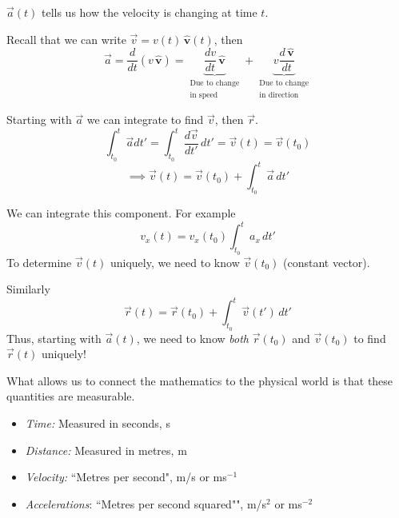 \documentclass[twoside]{scrartcl}
\newcommand{\vsp}{\vspace*{5pt}}
\let\oldhat\hat
\renewcommand{\hat}[1]{\,\oldhat{\boldsymbol{\mathbf{#1}}}}
\begin{document}
$\vec{a}(t)$ tells us how the velocity is changing at time $t$. 

Recall that we can write $\vec{v} = v(t)\hat{v}(t)$, then
\[\vec{a} = \frac{d}{dt}(v\hat{v}) = \underbrace{\frac{dv}{dt}\hat{v}}_{\substack{\text{Due to change}\\ \text{in speed}}} + \underbrace{v\frac{d\hat{v}}{dt}}_{\substack{\text{Due to change}\\ \text{in direction}}}\]



Starting with $\vec{a}$ we can integrate to find $\vec{v}$, then $\vec{r}$. 
\[\int_{t_0}^{t} \vec{a}dt' = \int_{t_0}^{t} \frac{d\vec{v}}{dt'}\,dt' = \vec{v}(t) = \vec{v}(t_0)
\]
\[\implies \vec{v}(t) = \vec{v}(t_0) + \int_{t_0}^t \vec{a}\,dt'\]

We can integrate this component. For example 
\[v_x(t) = v_x(t_0) \int_{t_0}^t a_x\,dt'\]
To determine $\vec{v}(t)$ uniquely, we need to know $\vec{v}(t_0)$ (constant vector). 

Similarly
\[\vec{r}(t) = \vec{r}(t_0) + \int_{t_0}^t \vec{v}(t')\,dt'\]
Thus, starting with $\vec{a}(t)$, we need to know \emph{both} $\vec{r}(t_0)$ and $\vec{v}(t_0)$ to find $\vec{r}(t)$ uniquely! 

What allows us to connect the mathematics to the physical world is that these quantities are measurable. \\

\begin{definition}[SI Units]\begin{itemize}
\item \emph{Time:} Measured in seconds, s

\item \emph{Distance:} Measured in metres, m

\item \emph{Velocity:} ``Metres per second", m/s or ms$^{-1}$
	
\item \emph{Accelerations}: ``Metres per second squared"", m/s$^2$ or ms$^{-2}$
\end{itemize}
\end{definition}\vsp
\end{document}
